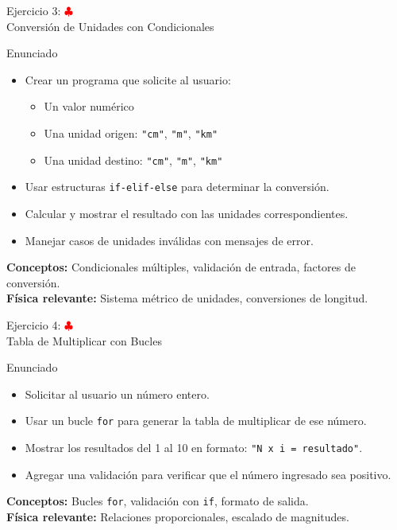 \documentclass[10pt]{beamer}
\begin{document}
\begin{frame}{Ejercicio 3: \hfill \textcolor{red}{$\clubsuit$} \\ Conversión de Unidades con Condicionales}
  \begin{block}{Enunciado}
    \begin{itemize}
      \item Crear un programa que solicite al usuario:
        \begin{itemize}
          \item Un valor numérico
          \item Una unidad origen: \texttt{"cm"}, \texttt{"m"}, \texttt{"km"}
          \item Una unidad destino: \texttt{"cm"}, \texttt{"m"}, \texttt{"km"}
        \end{itemize}
      \item Usar estructuras \texttt{if-elif-else} para determinar la conversión.
      \item Calcular y mostrar el resultado con las unidades correspondientes.
      \item Manejar casos de unidades inválidas con mensajes de error.
    \end{itemize}
  \end{block}
  
  \textbf{Conceptos:} Condicionales múltiples, validación de entrada, factores de conversión.
  \\
  \textbf{Física relevante:} Sistema métrico de unidades, conversiones de longitud.
\end{frame}

\begin{frame}{Ejercicio 4: \hfill \textcolor{red}{$\clubsuit$} \\ Tabla de Multiplicar con Bucles}
  \begin{block}{Enunciado}
    \begin{itemize}
      \item Solicitar al usuario un número entero.
      \item Usar un bucle \texttt{for} para generar la tabla de multiplicar de ese número.
      \item Mostrar los resultados del 1 al 10 en formato: \texttt{"N x i = resultado"}.
      \item Agregar una validación para verificar que el número ingresado sea positivo.
    \end{itemize}
  \end{block}
  
  \textbf{Conceptos:} Bucles \texttt{for}, validación con \texttt{if}, formato de salida.
  \\
  \textbf{Física relevante:} Relaciones proporcionales, escalado de magnitudes.
\end{frame}
\end{document}
